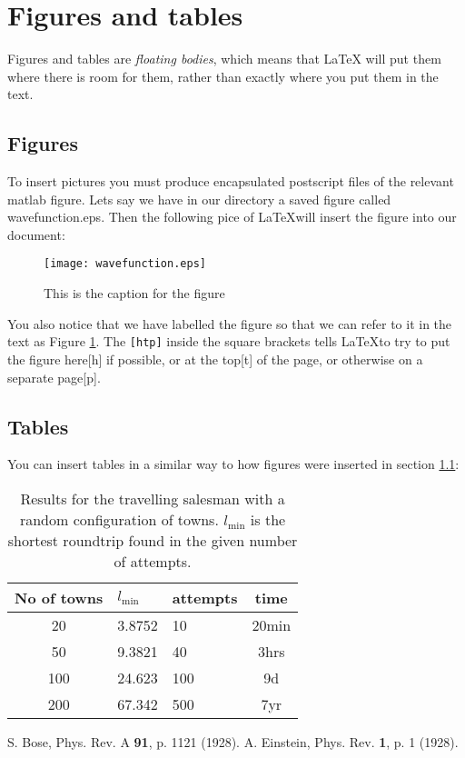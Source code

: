 \documentclass[12pt,a4paper]{article}
\begin{document}
\section{Figures and tables}
\label{figsandtabs}

Figures and tables are {\em floating bodies}, which means that \LaTeX
will put them where there is room for them, rather than exactly where
you put them in the text.

\subsection{Figures}
\label{figs}

To insert pictures you must produce encapsulated postscript files of
the relevant matlab figure. Lets say we have in our directory a saved
figure called wavefunction.eps. Then the following pice of \LaTeX will
insert the figure into our document:

\begin{figure}[htp]
\begin{center}
\texttt{[image: wavefunction.eps]}
\end{center}
\caption{This is the caption for the figure}
\label{fig1}
\end{figure}

You also notice that we have labelled the figure so that we can refer
to it in the text as Figure \ref{fig1}.  The {\tt [htp]} inside the
square brackets tells \LaTeX to try to put the figure here[h] if
possible, or at the top[t] of the page, or otherwise on a separate
page[p]. 

\subsection{Tables}
\label{tabs}

You can insert tables in a similar way to how figures were inserted in
section \ref{figs}:

\begin{table}[hbt]
\begin{center}
\begin{tabular}{|c|llc|}
No of towns & $l_{\min}$ & attempts & time\\ \hline
20 & 3.8752 & 10 & 20min \\
50 & 9.3821 & 40 & 3hrs \\
100 & 24.623 & 100 & 9d \\
200 & 67.342 & 500 & 7yr
\end{tabular}
\end{center}
\caption{Results for the travelling salesman with a random
  configuration of towns. $l_{\min}$ is the shortest
roundtrip found in the given number of attempts.}
\label{tab:results}
\end{table}

\begin{thebibliography}{99}
 S. Bose, Phys. Rev. A {\bf 91}, p. 1121 (1928).
 A. Einstein, Phys. Rev. {\bf 1}, p. 1 (1928).
\end{thebibliography}
\end{document}
